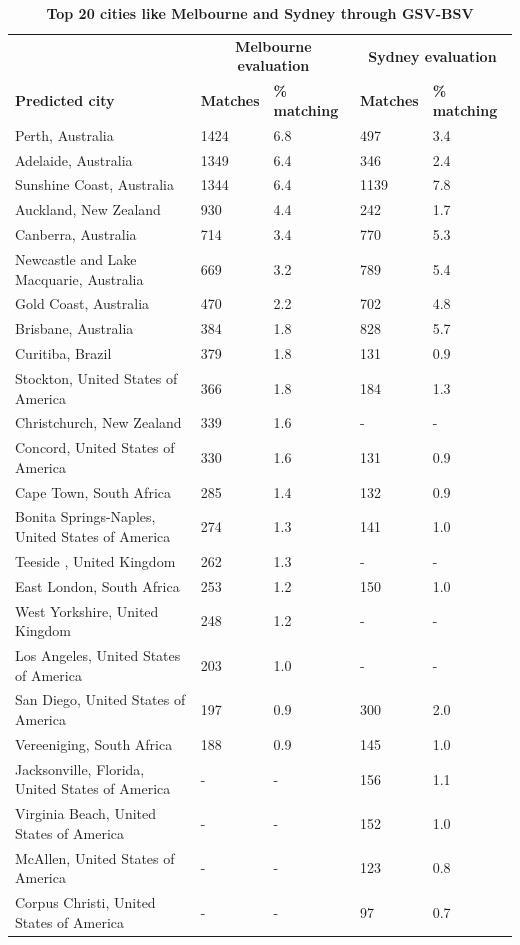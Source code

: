 \documentclass[10pt,letterpaper,hidelinks]{article}
\begin{document}
\begin{table}[!htbp]
\begin{adjustwidth}{-2.25in}{0in}
\caption{\bf Top 20 cities like Melbourne and Sydney through GSV-BSV \label{tab:melbournesydneyGSV}}     
\begin{tabular}{ l  l l l  l}
 \hline    &  \multicolumn{2}{c}{\textbf{Melbourne evaluation}} & \multicolumn{2}{c}{\textbf{Sydney evaluation}}  \\  
\textbf{Predicted city} & \textbf{Matches} & \textbf{\% matching}  & \textbf{Matches} & \textbf{\% matching}\\ \hline
Perth, Australia & 1424 & 6.8 & 497 & 3.4 \\ 
Adelaide, Australia & 1349 & 6.4 & 346 & 2.4 \\ 
Sunshine Coast, Australia & 1344 & 6.4 & 1139 & 7.8 \\ 
Auckland, New Zealand & 930 & 4.4 & 242 & 1.7 \\ 
Canberra, Australia & 714 & 3.4 & 770 & 5.3 \\ 
Newcastle and Lake Macquarie, Australia & 669 & 3.2 & 789 & 5.4 \\ 
Gold Coast, Australia & 470 & 2.2 & 702 & 4.8 \\ 
Brisbane, Australia & 384 & 1.8 & 828 & 5.7 \\ 
Curitiba, Brazil & 379 & 1.8 & 131 & 0.9 \\ 
Stockton, United States of America & 366 & 1.8 & 184 & 1.3 \\ 
Christchurch, New Zealand & 339 & 1.6 &-&- \\ 
Concord, United States of America & 330 & 1.6 & 131 & 0.9 \\ 
Cape Town, South Africa & 285 & 1.4 & 132 & 0.9 \\ 
Bonita Springs-Naples, United States of America & 274 & 1.3 & 141 & 1.0 \\ 
Teeside , United Kingdom & 262 & 1.3 &-&- \\ 
East London, South Africa & 253 & 1.2 & 150 & 1.0 \\ 
West Yorkshire, United Kingdom & 248 & 1.2 &-&- \\ 
Los Angeles, United States of America & 203 & 1.0 &-&- \\ 
San Diego, United States of America & 197 & 0.9 & 300 & 2.0 \\ 
Vereeniging, South Africa & 188 & 0.9 & 145 & 1.0 \\ 
Jacksonville, Florida, United States of America  &-&- & 156 & 1.1\\ 
Virginia Beach, United States of America  &-&- & 152 & 1.0\\ 
McAllen, United States of America&-&- & 123 & 0.8\\ 
Corpus Christi, United States of America&-&- & 97 & 0.7\\ \hline
\end{tabular}
\end{adjustwidth}
\end{table}
\end{document}
